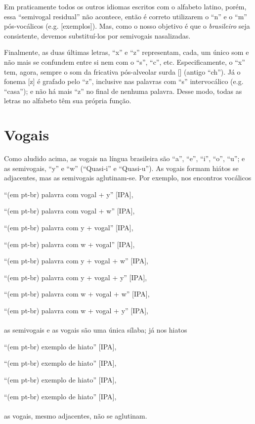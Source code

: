 \documentclass[12pt, a5paper, titlepage]{article}
\begin{document}
Em praticamente todos os outros idiomas escritos com o alfabeto latino, porém,
essa ``semivogal residual'' não acontece, então é correto utilizarem o ``n'' e
o ``m'' pós-vocálicos (e.g. [exemplos]). Mas, como o nosso objetivo é que o
\textit{brasileiro} seja consistente, devemos substituí-los por semivogais
nasalizadas.

Finalmente, as duas últimas letras, ``x'' e ``z'' representam, cada, um único
som e não mais se confundem entre si nem com o ``s'', ``c'', etc.
Especificamente, o ``x'' tem, agora, sempre o som da fricativa pós-alveolar
surda [\textesh] (antigo ``ch''). Já o fonema [z] é grafado pelo ``z'',
inclusive nas palavras com ``s'' intervocálico (e.g. ``casa''); e não há mais
``z'' no final de nenhuma palavra. Desse modo, todas as letras no alfabeto têm
sua própria função.

\section{Vogais}
Como aludido acima, as vogais na língua brasileira são ``a'', ``e'', ``i'',
``o'', ``u''; e as semivogais, ``y'' e ``w'' (``Quasi-i'' e ``Quasi-u''). As
vogais formam hiátos se adjacentes, mas as semivogais aglutinam-se. Por exemplo, nos encontros vocálicos
\\
\par ``(em pt-br) palavra com vogal + y'' {[IPA]},
\par ``(em pt-br) palavra com vogal + w'' {[IPA]},
\par ``(em pt-br) palavra com y + vogal'' {[IPA]},
\par ``(em pt-br) palavra com w + vogal'' {[IPA]},
\par ``(em pt-br) palavra com y + vogal + w'' {[IPA]},
\par ``(em pt-br) palavra com y + vogal + y'' {[IPA]},
\par ``(em pt-br) palavra com w + vogal + w'' {[IPA]},
\par ``(em pt-br) palavra com w + vogal + y'' {[IPA]},
\\
\\
as semivogais e as vogais são uma única sílaba; já nos hiatos
\\
\par ``(em pt-br) exemplo de hiato'' [IPA],
\par ``(em pt-br) exemplo de hiato'' [IPA],
\par ``(em pt-br) exemplo de hiato'' [IPA],
\par ``(em pt-br) exemplo de hiato'' [IPA],
\\
\\
as vogais, mesmo adjacentes, não se aglutinam.
\end{document}
